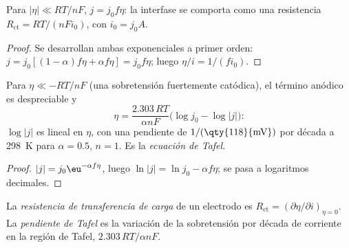 \begin{corollary}\label{cor:b3:electrode-kinetics:linear}
Para $|\eta| \ll RT/nF$, $j = j_0f\eta$: la interfase se comporta como una resistencia
$R_{\mathrm{ct}} = RT/(nFi_0)$, con $i_0 = j_0A$.
\end{corollary}

\begin{proof}
Se desarrollan ambas exponenciales a primer orden: $j = j_0[(1 - \alpha)f\eta + \alpha f\eta] = j_0f\eta$; luego
$\eta/i = 1/(fi_0)$.
\end{proof}

\begin{corollary}\label{cor:b3:electrode-kinetics:tafel}
Para $\eta \ll -RT/nF$ (una sobretensión fuertemente catódica), el término anódico es
despreciable y
\[
  \eta = \frac{2.303\,RT}{\alpha nF}\bigl(\log j_0 - \log|j|\bigr):
\]
$\log|j|$ es lineal en $\eta$, con una pendiente de $1/(\text{\qty{118}{mV}})$ por década a \qty{298}{K} para $\alpha = 0.5$, $n =
1$. Es la \emph{ecuación de Tafel}.
\end{corollary}

\begin{proof}
$|j| = j_0\eu^{-\alpha f\eta}$, luego $\ln|j| = \ln j_0 - \alpha f\eta$; se pasa a logaritmos decimales.
\end{proof}

\begin{definition}\label{def:b3:electrode-kinetics:charge-transfer}
La \emph{resistencia de transferencia de carga} de un
electrodo es $R_{\mathrm{ct}} = (\partial\eta/\partial i)_{\eta = 0}$. La \emph{pendiente de Tafel}
es la variación de la sobretensión por década de corriente en la región de Tafel,
$2.303\,RT/\alpha nF$.
\end{definition}

